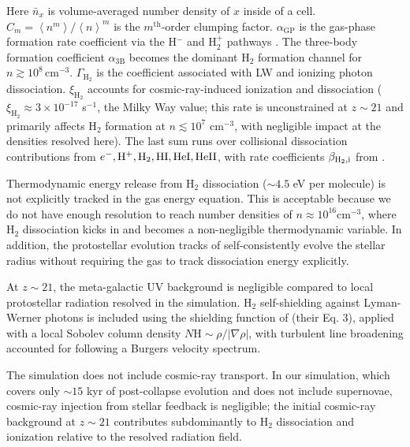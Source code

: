 \documentclass[twocolumn]{openjournal}
\begin{document}
Here $\bar{n}_x$ is volume-averaged number density of $x$ inside of a cell.
$C_m = \left< n^m \right> / \left< n \right>^m$ is the $m^{\text{th}}$-order
clumping factor.
$\alpha_\mathrm{GP}$ is the gas-phase formation rate coefficient via the
H$^{-}$ and H$_2^+$ pathways \citep{Glover_Jappsen_2007,Abel_1997,Galli_Palla_1998}.
The three-body formation coefficient $\alpha_{3\mathrm{B}}$
\citep{abel02,Palla_1983} becomes the dominant H$_2$ formation channel
for $n \gtrsim 10^8\,\mathrm{cm}^{-3}$.
$\Gamma_{\mathrm{H_2}}$ is the coefficient associated with LW and ionizing photon
dissociation.
$\xi_{\mathrm{H_2}}$ accounts for cosmic-ray-induced ionization and dissociation
($\xi_{\mathrm{H_2}} \approx 3\times10^{-17}$ s$^{-1}$, the Milky Way value;
this rate is unconstrained at $z \sim 21$ and primarily affects H$_2$ formation
at $n \lesssim 10^7$ cm$^{-3}$, with negligible impact at the densities resolved here).
The last sum runs over collisional dissociation contributions from
$e^-, \rm H^+, H_2, HI, HeI, HeII$, with rate coefficients $\beta_{\rm H_2, i}$ from \citet{Glover_Abel_2008}.

Thermodynamic energy release from H$_2$ dissociation
($\sim 4.5$ eV per molecule) is not explicitly tracked in the gas energy equation.
This is acceptable because we do not have enough resolution to reach number
densities of $n \approx 10^{16} \mathrm{cm}^{-3}$, where H$_2$ dissociation
kicks in and becomes a non-negligible thermodynamic variable.
\citep{klessen_glover23} In addition, the
protostellar evolution tracks of \citet{Offner_2009} self-consistently evolve
the stellar radius without requiring the gas to track dissociation energy
explicitly.

At $z \sim 21$, the meta-galactic UV background \citep{Faucher-Giguere_2019} is
negligible compared to local protostellar radiation resolved in the simulation.
H$_2$ self-shielding against Lyman-Werner photons is included using the
shielding function of \citet{Gnedin_Draine_2014} (their Eq. 3), applied with a
local Sobolev column density $N\mathrm{H} \sim \rho / |\nabla \rho|$, with
turbulent line broadening accounted for following a Burgers velocity spectrum.



The simulation does not include cosmic-ray transport.
In our simulation, which covers only $\sim 15$ kyr of post-collapse
evolution and does not include supernovae, cosmic-ray injection from
stellar feedback is negligible; the initial cosmic-ray background
at $z \sim 21$ contributes subdominantly to H$_2$ dissociation and
ionization relative to the resolved radiation field.
\end{document}
